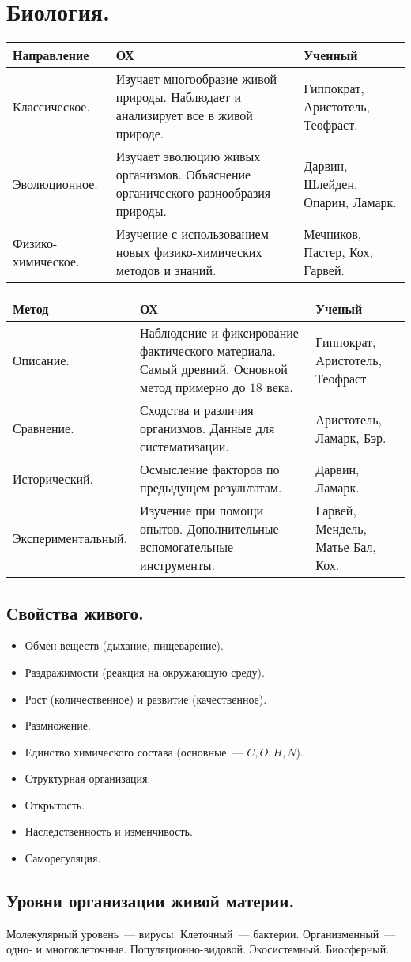 \documentclass{article}
\begin{document}
	\tableofcontents
	\setcounter{tocdepth}{3}
	\newpage
	\section{Биология.}
	\begin{xltabular}{\textwidth}{|p{3cm}|X|p{3cm}|}
		\hline
		Направление & ОХ & Ученный \\
		\hline
		Классическое. & Изучает многообразие живой природы. Наблюдает и анализирует все в живой природе. & Гиппократ, Аристотель, Теофраст. \\
		\hline
		Эволюционное. & Изучает эволюцию живых организмов. Объяснение органического разнообразия природы. & Дарвин, Шлейден, Опарин, Ламарк. \\
		\hline
		Физико-химическое. & Изучение с использованием новых физико-химических методов и знаний. & Мечников, Пастер, Кох, Гарвей. \\
		\hline
	\end{xltabular}
	\begin{xltabular}{\textwidth}{|p{3.5cm}|X|p{3cm}|}
		\hline
		Метод & ОХ & Ученый \\
		\hline
		Описание. & Наблюдение и фиксирование фактического материала. Самый древний. Основной метод примерно до $18$ века. & Гиппократ, Аристотель, Теофраст. \\
		\hline
		Сравнение. & Сходства и различия организмов. Данные для систематизации. & Аристотель, Ламарк, Бэр. \\
		\hline
		Исторический. & Осмысление факторов по предыдущем результатам. & Дарвин, Ламарк. \\
		\hline
		Экспериментальный. & Изучение при помощи опытов. Дополнительные вспомогательные инструменты. & Гарвей, Мендель, Матье Бал, Кох. \\
		\hline
	\end{xltabular}
	\subsection{Свойства живого.}
	\begin{itemize}
		\item Обмен веществ (дыхание, пищеварение).
		\item Раздражимости (реакция на окружающую среду).
		\item Рост (количественное) и развитие (качественное).
		\item Размножение.
		\item Единство химического состава (основные~--- $C, O, H, N$).
		\item Структурная организация.
		\item Открытость.
		\item Наследственность и изменчивость.
		\item Саморегуляция.
	\end{itemize}
	\subsection{Уровни организации живой материи.}
	Молекулярный уровень~--- вирусы. Клеточный~--- бактерии. Организменный~--- одно- и многоклеточные. Популяционно-видовой. Экосистемный. Биосферный.
\end{document}

